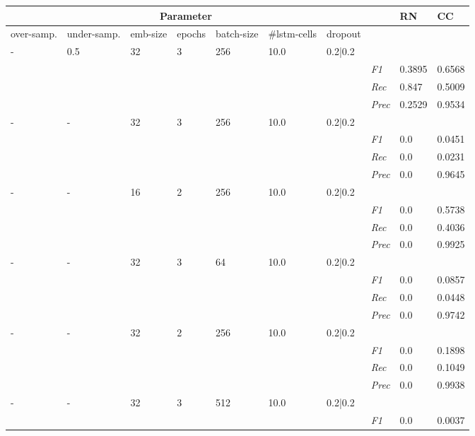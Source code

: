 \begin{table}[]
\tiny
\tabcolsep=0.11cm
\begin{tabularx}{\textwidth}{XXXXXXX|X|X|X}
\toprule
\multicolumn{7}{c}{Parameter} & & RN & CC \\ \midrule
over-\newline samp. & under-\newline samp. & emb-\newline size & epochs &batch-\newline size & \#lstm-\newline cells & dropout & & & \\ \midrule
- & 0.5 & 32 & 3 & 256 &10.0 & 0.2|0.2 & & & \\
& & & & & & & \textit{F1} & 0.3895 & 0.6568        \\
& & & & & & & \textit{Rec} &  0.847 & 0.5009    \\
& & & & & & & \textit{Prec} & 0.2529 & 0.9534  \\ \midrule
- & - & 32 & 3 & 256 &10.0 & 0.2|0.2 & & & \\
& & & & & & & \textit{F1} & 0.0 & 0.0451        \\
& & & & & & & \textit{Rec} &  0.0 & 0.0231    \\
& & & & & & & \textit{Prec} & 0.0 & 0.9645  \\ \midrule
- & - & 16 & 2 & 256 &10.0 & 0.2|0.2 & & & \\
& & & & & & & \textit{F1} & 0.0 & 0.5738        \\
& & & & & & & \textit{Rec} &  0.0 & 0.4036    \\
& & & & & & & \textit{Prec} & 0.0 & 0.9925  \\ \midrule
- & - & 32 & 3 & 64 &10.0 & 0.2|0.2 & & & \\
& & & & & & & \textit{F1} & 0.0 & 0.0857        \\
& & & & & & & \textit{Rec} &  0.0 & 0.0448    \\
& & & & & & & \textit{Prec} & 0.0 & 0.9742  \\ \midrule
- & - & 32 & 2 & 256 &10.0 & 0.2|0.2 & & & \\
& & & & & & & \textit{F1} & 0.0 & 0.1898        \\
& & & & & & & \textit{Rec} &  0.0 & 0.1049    \\
& & & & & & & \textit{Prec} & 0.0 & 0.9938  \\ \midrule
- & - & 32 & 3 & 512 &10.0 & 0.2|0.2 & & & \\
& & & & & & & \textit{F1} & 0.0 & 0.0037        \\

\end{tabularx}
\end{table}
